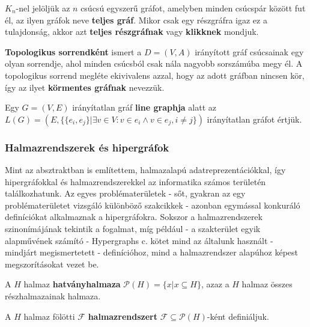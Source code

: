 \begin{definition}
$K_n$-nel jelöljük az $n$ csúcsú egyszerű gráfot, amelyben minden csúcspár között fut él, az ilyen gráfok neve \textbf{teljes gráf}. Mikor csak egy részgráfra igaz ez a tulajdonság, akkor azt \textbf{teljes részgráfnak} vagy \textbf{klikknek} mondjuk.
\end{definition}


\begin{definition}
\textbf{Topologikus sorrendként} ismert a $D=(V,A)$ irányított gráf csúcsainak egy olyan sorrendje, ahol minden csúcsból csak nála nagyobb sorszámúba megy él. A topologikus sorrend megléte ekivivalens azzal, hogy az adott gráfban nincsen kör, így az ilyet \textbf{körmentes gráfnak} nevezzük.
\end{definition}

\begin{definition}
Egy $G=(V,E)$ irányítatlan gráf \textbf{line graphja} alatt az $L(G)=(E, \{ \{ e_i, e_j \} | \exists v \in V : v \in e_i \land v \in e_j, i \neq j \})$ irányítatlan gráfot értjük.
\end{definition}

\subsubsection{Halmazrendszerek és hipergráfok}

Mint az absztraktban is említettem, halmazalapú adatreprezentációkkal, így hipergráfokkal és halmazrendszerekkel az informatika számos területén találkozhatunk. Az egyes problématerületek - sőt, gyakran az egy problématerületet vizsgáló különböző szakcikkek - azonban egymással konkuráló definíciókat alkalmaznak a hipergráfokra. Sokszor a halmazrendszerek szinonímájának tekintik a fogalmat, míg például - a szakterület egyik alapművének számító - Hypergraphs c. \cite{berge_hypergraphs_book} kötet mind az általunk használt - mindjárt megismertetett - definícióhoz, mind a halmazrendszer alapúhoz képest megszorításokat vezet be.

\begin{definition}
A $H$ halmaz \textbf{hatványhalmaza} $\mathcal{P}(H) = \{x | x \subseteq H\}$, azaz a $H$ halmaz összes részhalmazainak halmaza.
\end{definition}

\begin{definition}
A $H$ halmaz fölötti $\mathcal{F}$ \textbf{halmazrendszert} $\mathcal{F} \subseteq \mathcal{P}(H)$-ként definiáljuk.
\end{definition}

